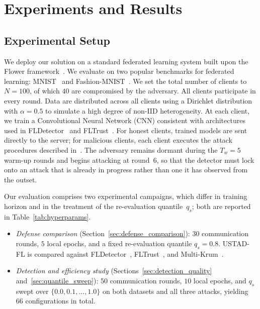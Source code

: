 \documentclass[journal]{IEEEtran}
\begin{document}
\section{Experiments and Results}
\label{sec:experiments}

\subsection{Experimental Setup}

We deploy our solution on a standard federated learning system built upon the Flower framework~\cite{beutel2020flower}. We evaluate on two popular benchmarks for federated learning: MNIST~\cite{lecun1998mnist} and Fashion-MNIST~\cite{xiao2017fashion}. We set the total number of clients to $N = 100$, of which $40$ are compromised by the adversary. All clients participate in every round. Data are distributed across all clients using a Dirichlet distribution with $\alpha = 0.5$ to simulate a high degree of non-IID heterogeneity. At each client, we train a Convolutional Neural Network (CNN) consistent with architectures used in FLDetector~\cite{zhang2022fldetector} and FLTrust~\cite{cao2020fltrust}. For honest clients, trained models are sent directly to the server; for malicious clients, each client executes the attack procedures described in~\cite{baruch2019little, fang2020local}. The adversary remains dormant during the $T_w = 5$ warm-up rounds and begins attacking at round~$6$, so that the detector must lock onto an attack that is already in progress rather than one it has observed from the outset.

Our evaluation comprises two experimental campaigns, which differ in training horizon and in the treatment of the re-evaluation quantile~$q_s$; both are reported in Table~\ref{tab:hyperparams}.
\begin{itemize}
    \item \emph{Defense comparison} (Section~\ref{sec:defense_comparison}): $30$ communication rounds, $5$ local epochs, and a fixed re-evaluation quantile $q_s = 0.8$. USTAD-FL is compared against FLDetector~\cite{zhang2022fldetector}, FLTrust~\cite{cao2020fltrust}, and Multi-Krum~\cite{blanchard2017machine}.
    \item \emph{Detection and efficiency study} (Sections~\ref{sec:detection_quality} and~\ref{sec:quantile_sweep}): $50$ communication rounds, $10$ local epochs, and $q_s$ swept over $\{0.0, 0.1, \ldots, 1.0\}$ on both datasets and all three attacks, yielding $66$ configurations in total.
\end{itemize}
\end{document}
